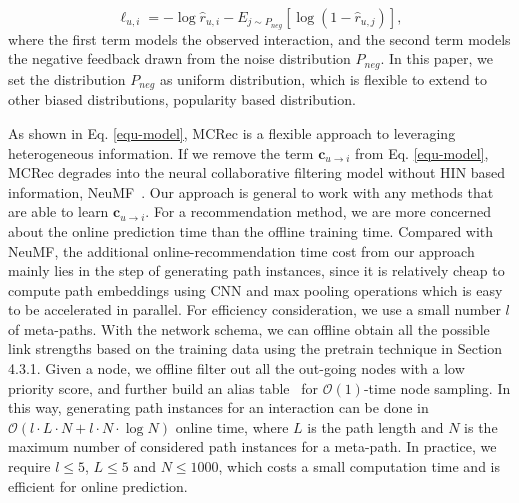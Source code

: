 \begin{equation} \label{equ-loss}
\ell_{u, i} = - \log \hat{r}_{u,i} - {E_{j \sim P_{neg}}[\log(1 - \hat{r}_{u,j})]},
\end{equation}
where the first term models the observed interaction, and the second term models the negative feedback drawn from the noise distribution $P_{neg}$.
 In this paper, we set the distribution $P_{neg}$ as uniform distribution, which is flexible to extend to other biased distributions, \eg popularity based distribution.
 
As shown in Eq. \ref{equ-model},  MCRec is a flexible approach to leveraging heterogeneous information. If we remove the term $\mathbf{c}_{u \rightarrow i}$ from Eq. \ref{equ-model}, MCRec degrades into the neural collaborative filtering model without HIN based information, \ie NeuMF~\cite{he2017neural}. Our approach is general to work with any methods that are able to learn $\mathbf{c}_{u \rightarrow i}$.
For a recommendation method, we are more concerned about the online prediction time than the offline training time. 
Compared with NeuMF, the additional online-recommendation time cost  from our approach mainly lies in the step of generating path instances, since it is relatively cheap to compute path embeddings using CNN and max pooling operations which is easy to be accelerated in parallel.  
For efficiency consideration, we use a small number $l$ of meta-paths. 
With the network schema, we can offline obtain all the possible link strengths based on the training data using the pretrain technique in Section 4.3.1. 
Given a node, we offline filter out all the out-going nodes with a low priority score, and further build an alias table~\cite{aliastable} for $\mathcal{O}(1)$-time node sampling. 
In this way, generating path instances for an interaction can be done in $\mathcal{O}(l \cdot L\cdot N + l \cdot N \cdot \log N)$ online time, where $L$ is the path length and $N$ is the maximum number of considered path instances for a meta-path.
In practice, we require $l \le 5$, $L \le 5$  and $N \le 1000$, which costs a small  computation time and is efficient for online prediction.
